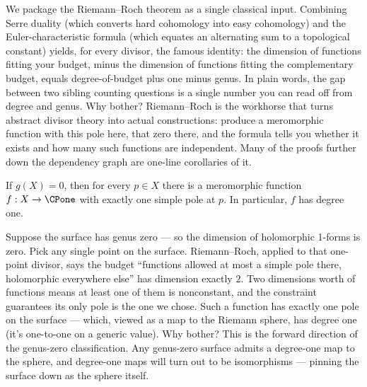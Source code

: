 \begin{layman}
We package the Riemann--Roch theorem as a single classical input.
Combining Serre duality (which converts hard cohomology into easy
cohomology) and the Euler-characteristic formula (which equates an
alternating sum to a topological constant) yields, for every divisor,
the famous identity: the dimension of functions fitting your budget,
minus the dimension of functions fitting the complementary budget,
equals degree-of-budget plus one minus genus. In plain words, the gap
between two sibling counting questions is a single number you can read
off from degree and genus. Why bother? Riemann--Roch is the workhorse
that turns abstract divisor theory into actual constructions: produce a
meromorphic function with this pole here, that zero there, and the
formula tells you whether it exists and how many such functions are
independent. Many of the proofs further down the dependency graph are
one-line corollaries of it.
\end{layman}

\begin{proposition}
\label{prop:genus-zero-degree-one-map}
If \(g(X)=0\), then for every \(p\in X\) there is a meromorphic function
\(f:X\to\CPone\) with exactly one simple pole at \(p\). In particular, \(f\)
has degree one.
\leanok
\end{proposition}

\begin{layman}
Suppose the surface has genus zero --- so the dimension of holomorphic
1-forms is zero. Pick any single point on the surface. Riemann--Roch,
applied to that one-point divisor, says the budget ``functions allowed
at most a simple pole there, holomorphic everywhere else'' has dimension
exactly \(2\). Two dimensions worth of functions means at least one of
them is nonconstant, and the constraint guarantees its only pole is the
one we chose. Such a function has exactly one pole on the surface ---
which, viewed as a map to the Riemann sphere, has degree one (it's
one-to-one on a generic value). Why bother? This is the forward
direction of the genus-zero classification. Any genus-zero surface
admits a degree-one map to the sphere, and degree-one maps will turn out
to be isomorphisms --- pinning the surface down as the sphere
itself.
\end{layman}

